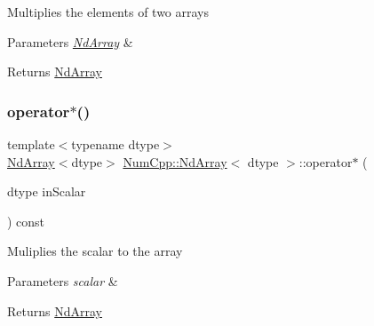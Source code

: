 Multiplies the elements of two arrays


\begin{DoxyParams}{Parameters}
{\em \mbox{\hyperlink{class_num_cpp_1_1_nd_array}{Nd\+Array}}} & \\
\hline
\end{DoxyParams}
\begin{DoxyReturn}{Returns}
\mbox{\hyperlink{class_num_cpp_1_1_nd_array}{Nd\+Array}} 
\end{DoxyReturn}
\mbox{\label{class_num_cpp_1_1_nd_array_a568ee4f337eed708e51242f78362fc6c}} 
\subsubsection{\texorpdfstring{operator$\ast$()}{operator*()}\hspace{0.1cm}{\footnotesize\ttfamily [2/2]}}
{\footnotesize\ttfamily template$<$typename dtype$>$ \\
\mbox{\hyperlink{class_num_cpp_1_1_nd_array}{Nd\+Array}}$<$dtype$>$ \mbox{\hyperlink{class_num_cpp_1_1_nd_array}{Num\+Cpp\+::\+Nd\+Array}}$<$ dtype $>$\+::operator$\ast$ (\begin{DoxyParamCaption}\item[{dtype}]{in\+Scalar }\end{DoxyParamCaption}) const\hspace{0.3cm}{\ttfamily [inline]}}

Muliplies the scalar to the array


\begin{DoxyParams}{Parameters}
{\em scalar} & \\
\hline
\end{DoxyParams}
\begin{DoxyReturn}{Returns}
\mbox{\hyperlink{class_num_cpp_1_1_nd_array}{Nd\+Array}} 
\end{DoxyReturn}
\mbox{\label{class_num_cpp_1_1_nd_array_abce0089c3e8fc1a45035772627b3beaa}} 
